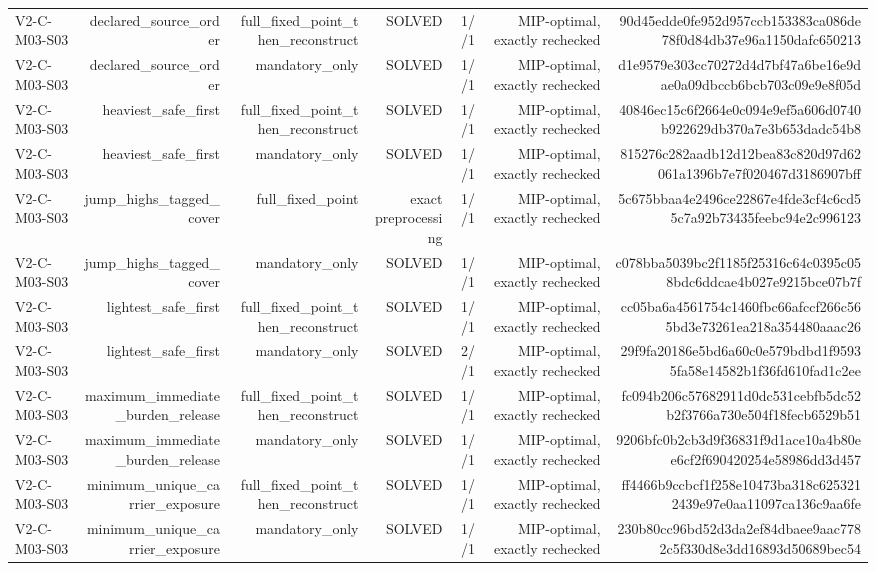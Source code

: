 {\begin{longtable}{lrrrrrr}
V2-C-M03-S03 & declared\_source\_order & full\_fixed\_point\_then\_reconstruct & SOLVED & 1//1 & MIP-optimal, exactly rechecked & 90d45edde0fe952d957ccb153383ca086de78f0d84db37e96a1150dafc650213 \\
V2-C-M03-S03 & declared\_source\_order & mandatory\_only & SOLVED & 1//1 & MIP-optimal, exactly rechecked & d1e9579e303cc70272d4d7bf47a6be16e9dae0a09dbccb6bcb703c09e9e8f05d \\
V2-C-M03-S03 & heaviest\_safe\_first & full\_fixed\_point\_then\_reconstruct & SOLVED & 1//1 & MIP-optimal, exactly rechecked & 40846ec15c6f2664e0c094e9ef5a606d0740b922629db370a7e3b653dadc54b8 \\
V2-C-M03-S03 & heaviest\_safe\_first & mandatory\_only & SOLVED & 1//1 & MIP-optimal, exactly rechecked & 815276c282aadb12d12bea83c820d97d62061a1396b7e7f020467d3186907bff \\
V2-C-M03-S03 & jump\_highs\_tagged\_cover & full\_fixed\_point & exact preprocessing & 1//1 & MIP-optimal, exactly rechecked & 5c675bbaa4e2496ce22867e4fde3cf4c6cd55c7a92b73435feebc94e2c996123 \\
V2-C-M03-S03 & jump\_highs\_tagged\_cover & mandatory\_only & SOLVED & 1//1 & MIP-optimal, exactly rechecked & c078bba5039bc2f1185f25316c64c0395c058bdc6ddcae4b027e9215bce07b7f \\
V2-C-M03-S03 & lightest\_safe\_first & full\_fixed\_point\_then\_reconstruct & SOLVED & 1//1 & MIP-optimal, exactly rechecked & cc05ba6a4561754c1460fbc66afccf266c565bd3e73261ea218a354480aaac26 \\
V2-C-M03-S03 & lightest\_safe\_first & mandatory\_only & SOLVED & 2//1 & MIP-optimal, exactly rechecked & 29f9fa20186e5bd6a60c0e579bdbd1f95935fa58e14582b1f36fd610fad1c2ee \\
V2-C-M03-S03 & maximum\_immediate\_burden\_release & full\_fixed\_point\_then\_reconstruct & SOLVED & 1//1 & MIP-optimal, exactly rechecked & fc094b206c57682911d0dc531cebfb5dc52b2f3766a730e504f18fecb6529b51 \\
V2-C-M03-S03 & maximum\_immediate\_burden\_release & mandatory\_only & SOLVED & 1//1 & MIP-optimal, exactly rechecked & 9206bfc0b2cb3d9f36831f9d1ace10a4b80ee6cf2f690420254e58986dd3d457 \\
V2-C-M03-S03 & minimum\_unique\_carrier\_exposure & full\_fixed\_point\_then\_reconstruct & SOLVED & 1//1 & MIP-optimal, exactly rechecked & ff4466b9ccbcf1f258e10473ba318c6253212439e97e0aa11097ca136c9aa6fe \\
V2-C-M03-S03 & minimum\_unique\_carrier\_exposure & mandatory\_only & SOLVED & 1//1 & MIP-optimal, exactly rechecked & 230b80cc96bd52d3da2ef84dbaee9aac7782c5f330d8e3dd16893d50689bec54 \\

\end{longtable}}
